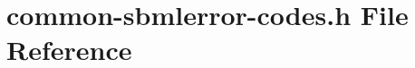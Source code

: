 \hypertarget{common-sbmlerror-codes_8h}{}\section{common-\/sbmlerror-\/codes.h File Reference}
\label{common-sbmlerror-codes_8h}

